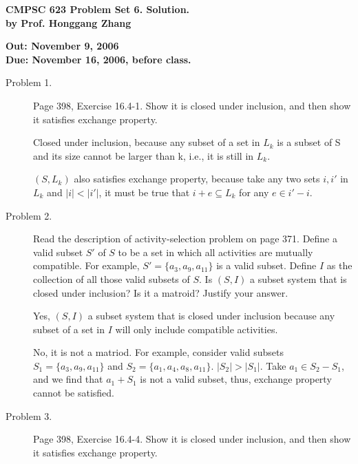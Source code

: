\documentclass[11pt]{article}
\begin{document}

\begin{center}
{\bf CMPSC 623 Problem Set 6. Solution.} \\
{\bf by Prof. Honggang Zhang} \\
\end{center}
\begin{center}
{\bf Out: November 9, 2006} \\
{\bf Due: November 16, 2006, before class.} \\

\end{center}


\begin{description}

\item[Problem 1.]
Page 398, Exercise 16.4-1. Show it is closed under inclusion, and then show it
satisfies exchange property.

Closed under inclusion, because any subset of a set in $L_k$ is a subset of S
and its size cannot be larger than k, i.e., it is still in $L_k$.

$(S,L_k)$ also satisfies exchange property, because take any two sets $i,i'$ in
$L_k$ and $|i|<|i'|$, it must be true that $i+e\subseteq L_k$ for any $e\in
i'-i$.


\item[Problem 2.]
Read the description of activity-selection problem on page 371. Define a valid
subset $S'$ of $S$ to be a set in which all activities are mutually compatible.
For example, $S'=\{a_3, a_9, a_{11}\}$ is a valid subset. Define $I$ as the
collection of all those valid subsets of $S$. Is $(S,I)$ a subset system that
is closed under inclusion? Is it a matroid? Justify your answer.

Yes, $(S,I)$ a subset system that is closed under inclusion because any subset
of a set in $I$ will only include compatible activities.

No, it is not a matriod. For example, consider valid subsets $S_1=\{a_3, a_9,
a_{11}\}$ and $S_2=\{ a_1, a_4, a_8, a_{11} \}$. $|S_2|>|S_1|$. Take $a_1\in
S_2-S_1$, and we find that $a_1 + S_1$ is not a valid subset, thus, exchange
property cannot be satisfied.


\item[Problem 3.]
Page 398, Exercise 16.4-4. Show it is closed under inclusion, and then show it
satisfies exchange property.


\end{description}
\end{document}
